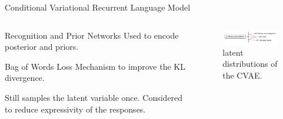 \documentclass[aspectratio=169, 11pt]{beamer}
\begin{document}
\begin{frame}{Conditional Variational Recurrent Language Model}
  \begin{columns}
    \begin{column}{0.5\textwidth}
      \begin{block}{Recognition and Prior Networks}
        Used to encode posterior and priors.
      \end{block}
      \begin{block}{Bag of Words Loss}
        Mechanism to improve the KL divergence.
      \end{block}
      \begin{block}{Still samples the latent variable once.}
        Considered to reduce expressivity of the responses.
      \end{block}
    \end{column}
    \begin{column}{0.5\textwidth}
      \begin{figure}[!ht]
        \centering
        \includegraphics[width=60mm]{diagrams/cvae_latent.png}
        \caption{latent distributions of the CVAE.}
        \end{figure}
    \end{column}
  \end{columns}

\end{frame}

\end{document}
